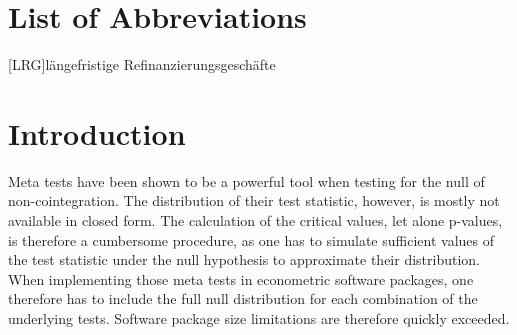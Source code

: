 \documentclass[12pt,a4paper]{article}
\begin{document}


{
\hypersetup{linkcolor=black}

\setcounter{tocdepth}{3}
\tableofcontents
}

\newpage
\listoffigures
{}

\listoftables
{}

\section*{List of Abbreviations}

\begin{adjustwidth}{1.5em}{0pt}

\begin{acronym}[dummyyyy]
 [LRG]{längefristige Refinanzierungsgeschäfte}

\end{acronym}

\end{adjustwidth}

\restoregeometry

\newpage
{} %

\hypertarget{introduction}{%
\section{Introduction}\label{introduction}}

Meta tests have been shown to be a powerful tool when testing for the
null of non-cointegration. The distribution of their test statistic,
however, is mostly not available in closed form. The calculation of the
critical values, let alone p-values, is therefore a cumbersome
procedure, as one has to simulate sufficient values of the test
statistic under the null hypothesis to approximate their distribution.
When implementing those meta tests in econometric software packages, one
therefore has to include the full null distribution for each combination
of the underlying tests. Software package size limitations are therefore
quickly exceeded.
\end{document}
